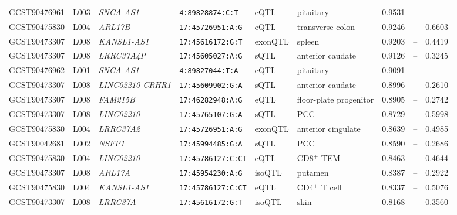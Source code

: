 \documentclass[11pt,a4paper]{article}
\begin{document}
\begin{landscape}
\begin{longtable}{@{}lllp{2.9cm}lp{3.1cm}rrr@{}}
GCST90476961 & L003 & \textit{SNCA-AS1} &
\texttt{4:89828874:C:T} &
eQTL & pituitary &
0.9531 & -- & -- \\

GCST90475830 & L004 & \textit{ARL17B} &
\texttt{17:45726951:A:G} &
eQTL & transverse colon &
0.9246 & -- & 0.6603 \\

GCST90473307 & L008 & \textit{KANSL1-AS1} &
\texttt{17:45616172:G:T} &
exonQTL & spleen &
0.9203 & -- & 0.4419 \\

GCST90473307 & L008 & \textit{LRRC37A4P} &
\texttt{17:45605027:A:G} &
sQTL & anterior caudate &
0.9126 & -- & 0.3245 \\

GCST90476962 & L001 & \textit{SNCA-AS1} &
\texttt{4:89827044:T:A} &
eQTL & pituitary &
0.9091 & -- & -- \\

GCST90473307 & L008 &
\textit{LINC02210-CRHR1} &
\texttt{17:45609902:G:A} &
sQTL & anterior caudate &
0.8996 & -- & 0.2610 \\

GCST90473307 & L008 & \textit{FAM215B} &
\texttt{17:46282948:A:G} &
eQTL & floor-plate progenitor &
0.8905 & -- & 0.2742 \\

GCST90473307 & L008 & \textit{LINC02210} &
\texttt{17:45765107:G:A} &
sQTL & PCC &
0.8729 & -- & 0.5998 \\

GCST90475830 & L004 & \textit{LRRC37A2} &
\texttt{17:45726951:A:G} &
exonQTL & anterior cingulate &
0.8639 & -- & 0.4985 \\

GCST90042681 & L002 & \textit{NSFP1} &
\texttt{17:45994485:G:A} &
sQTL & PCC &
0.8590 & -- & 0.2686 \\

GCST90475830 & L004 & \textit{LINC02210} &
\texttt{17:45786127:C:CT} &
eQTL & CD8$^{+}$ TEM &
0.8463 & -- & 0.4644 \\

GCST90473307 & L008 & \textit{ARL17A} &
\texttt{17:45954230:A:G} &
isoQTL & putamen &
0.8387 & -- & 0.2922 \\

GCST90475830 & L004 & \textit{KANSL1-AS1} &
\texttt{17:45786127:C:CT} &
eQTL & CD4$^{+}$ T cell &
0.8337 & -- & 0.5076 \\

GCST90473307 & L008 & \textit{LRRC37A} &
\texttt{17:45616172:G:T} &
isoQTL & skin &
0.8168 & -- & 0.3560 \\

\end{longtable}
\endgroup
\end{landscape}
\end{document}

